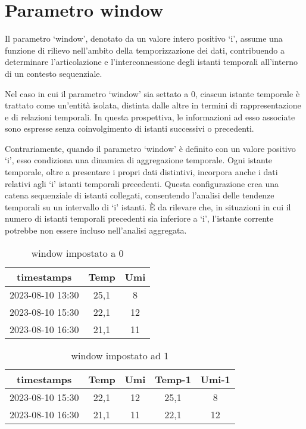 \documentclass{rapportECL}
\begin{document}
\section{Parametro window}

Il parametro `window', denotato da un valore intero positivo `i', assume una funzione di rilievo nell'ambito della temporizzazione dei dati, 
contribuendo a determinare l'articolazione e l'interconnessione degli istanti temporali all'interno di un contesto sequenziale.

Nel caso in cui il parametro `window' sia settato a 0, ciascun istante temporale è trattato come un'entità isolata, distinta dalle altre in termini 
di rappresentazione e di relazioni temporali. In questa prospettiva, le informazioni ad esso associate sono espresse senza coinvolgimento di 
istanti successivi o precedenti.

Contrariamente, quando il parametro `window' è definito con un valore positivo `i', esso condiziona una dinamica di aggregazione temporale. 
Ogni istante temporale, oltre a presentare i propri dati distintivi, incorpora anche i dati relativi agli `i' istanti temporali precedenti. 
Questa configurazione crea una catena sequenziale di istanti collegati, consentendo l'analisi delle tendenze temporali su un intervallo di `i' istanti. 
È da rilevare che, in situazioni in cui il numero di istanti temporali precedenti sia inferiore a `i', 
l'istante corrente potrebbe non essere incluso nell'analisi aggregata.



\begin{table}[h]
  \centering
  \begin{tabular}{|c|c|c|}

    \hline
    timestamps & Temp & Umi\\
    \hline
    2023-08-10 13:30 & 25,1 & 8\\
    \hline
    2023-08-10 15:30 & 22,1 & 12\\
    \hline
    2023-08-10 16:30 & 21,1 & 11\\
    \hline
  
  \end{tabular}
  
  \caption{window impostato a 0}
\end{table}


\begin{table}[h]
  \centering
  \begin{tabular}{|*{5}{c|}}
  
  \hline
  timestamps & Temp & Umi & Temp-1 & Umi-1\\
  \hline
  2023-08-10 15:30 & 22,1 & 12 & 25,1 & 8\\
  \hline
  2023-08-10 16:30 & 21,1 & 11 & 22,1 & 12\\
  \hline
  
  \end{tabular}
  
  \caption{window impostato ad 1}
\end{table}
\end{document}
